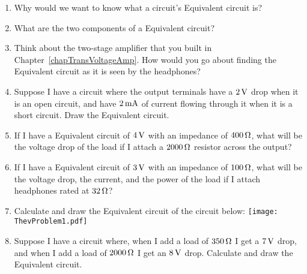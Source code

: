 \begin{enumerate}
\item Why would we want to know what a circuit's \thev Equivalent circuit is?
\item What are the two components of a \thev Equivalent circuit?
\item Think about the two-stage amplifier that you built in Chapter~\ref{chapTransVoltageAmp}.  How would you go about finding the \thev Equivalent circuit as it is seen by the headphones?
\item Suppose I have a circuit where the output terminals have a $2\,\si{\volt}$ drop when it is an open circuit, and have $2\,\si{\milli\ampere}$ of current flowing through it when it is a short circuit.  Draw the \thev Equivalent circuit.
\item If I have a \thev Equivalent circuit of $4\,\si{\volt}$ with an impedance of $400\,\si{\ohm}$, what will be the voltage drop of the load if I attach a $2000\,\si{\ohm}$ resistor across the output?
\item If I have a \thev Equivalent circuit of $3\,\si{\volt}$ with an impedance of $100\,\si{\ohm}$, what will be the voltage drop, the current, and the power of the load if I attach headphones rated at $32\,\si{\ohm}$?
\item Calculate and draw the \thev Equivalent circuit of the circuit below: 
\texttt{[image: ThevProblem1.pdf]}
\item Suppose I have a circuit where, when I add a load of $350\,\si{\ohm}$ I get a $7\,\si{\volt}$ drop, and when I add a load of $2000\,\si{\ohm}$ I get an $8\,\si{\volt}$ drop.  Calculate and draw the \thev Equivalent circuit.
\end{enumerate}
